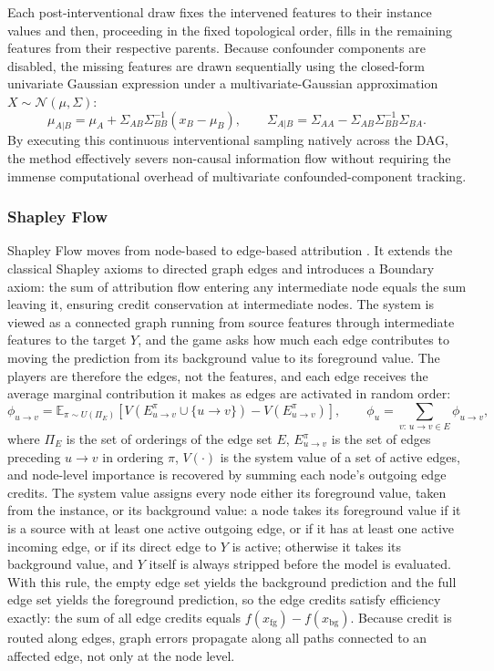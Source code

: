 \documentclass[12pt,a4paper,oneside]{article}
\begin{document}
Each post-interventional draw fixes the intervened features to their instance values and then, proceeding in the fixed topological order, fills in the remaining features from their respective parents. Because confounder components are disabled, the missing features are drawn sequentially using the closed-form univariate Gaussian expression under a multivariate-Gaussian approximation $X \sim \mathcal{N}(\mu, \Sigma)$:
\begin{equation}
  \mu_{A|B} = \mu_A + \Sigma_{AB}\Sigma_{BB}^{-1}(x_B - \mu_B),
  \qquad
  \Sigma_{A|B} = \Sigma_{AA} - \Sigma_{AB}\Sigma_{BB}^{-1}\Sigma_{BA}.
\end{equation}
By executing this continuous interventional sampling natively across the DAG, the method effectively severs non-causal information flow without requiring the immense computational overhead of multivariate confounded-component tracking.

\subsubsection{Shapley Flow}
\label{sec:flow}

Shapley Flow moves from node-based to edge-based attribution \citep{Wang2021}. It extends the classical Shapley axioms to directed graph edges and introduces a Boundary axiom: the sum of attribution flow entering any intermediate node equals the sum leaving it, ensuring credit conservation at intermediate nodes. The system is viewed as a connected graph running from source features through intermediate features to the target $Y$, and the game asks how much each edge contributes to moving the prediction from its background value to its foreground value. The players are therefore the edges, not the features, and each edge receives the average marginal contribution it makes as edges are activated in random order:
\begin{equation}
  \phi_{u \to v} = \mathbb{E}_{\pi \sim U(\Pi_E)}
  \left[ V(E_{u \to v}^\pi \cup \{u \to v\}) - V(E_{u \to v}^\pi) \right],
  \qquad
  \phi_u = \sum_{v:\, u \to v \in E} \phi_{u \to v},
\end{equation}
where $\Pi_E$ is the set of orderings of the edge set $E$, $E_{u \to v}^\pi$ is the set of edges preceding $u \to v$ in ordering $\pi$, $V(\cdot)$ is the system value of a set of active edges, and node-level importance is recovered by summing each node's outgoing edge credits. The system value assigns every node either its foreground value, taken from the instance, or its background value: a node takes its foreground value if it is a source with at least one active outgoing edge, or if it has at least one active incoming edge, or if its direct edge to $Y$ is active; otherwise it takes its background value, and $Y$ itself is always stripped before the model is evaluated. With this rule, the empty edge set yields the background prediction and the full edge set yields the foreground prediction, so the edge credits satisfy efficiency exactly: the sum of all edge credits equals $f(x_{\mathrm{fg}}) - f(x_{\mathrm{bg}})$. Because credit is routed along edges, graph errors propagate along all paths connected to an affected edge, not only at the node level.
\end{document}
